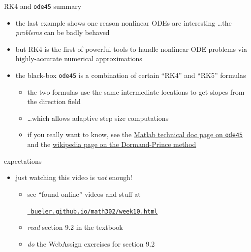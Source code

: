 \documentclass[urlcolor=blue,dvipsnames]{beamer}
\begin{document}
\begin{frame}{RK4 and \texttt{ode45} summary}

\begin{itemize}
\item the last example shows one reason nonlinear ODEs are interesting \dots the \emph{problems} can be badly behaved
\item but RK4 is the first of powerful tools to handle nonlinear ODE problems via highly-accurate numerical approximations
\item the black-box \texttt{ode45} is a combination of certain ``RK4'' and ``RK5'' formulas
   \begin{itemize}
   \item the two formulas use the same intermediate locations to get slopes from the direction field
   \item \dots which allows adaptive step size computations
   \item if you really want to know, see the \href{https://www.mathworks.com/help/matlab/ref/ode45.html}{Matlab technical doc page on \texttt{ode45}} and the \href{https://en.wikipedia.org/wiki/Dormand-Prince_method}{wikipedia page on the Dormand-Prince method}
   \end{itemize}
\end{itemize}
\end{frame}


\begin{frame}{expectations}

\begin{itemize}
\item just watching this video is \emph{not} enough!
     \begin{itemize}
     \item see ``found online'' videos and stuff at

     \centerline{\href{https://bueler.github.io/math302/week10.html}{\tt \color{cyan} bueler.github.io/math302/week10.html}}
     \item \emph{read} section 9.2 in the textbook
     \item \emph{do} the WebAssign exercises for section 9.2
     \end{itemize}
\end{itemize}
\end{frame}
\end{document}

